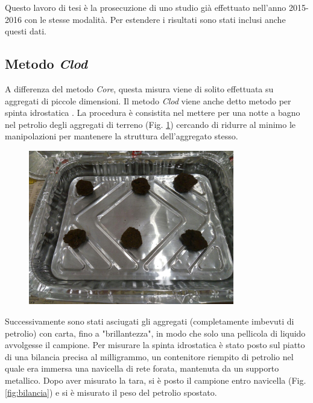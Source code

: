 \documentclass[11pt, a4paper, openright, titlepage, final, language = italian]{book}
\begin{document}
Questo lavoro di tesi \`e la prosecuzione di uno studio gi\`a
effettuato nell'anno 2015-2016 con le stesse modalit\`a. Per estendere
i risultati sono stati inclusi anche questi dati.



\subsection{Metodo \emph{Clod}}%

A differenza del metodo \emph{Core}, questa misura viene di solito
effettuata su aggregati di piccole dimensioni.  Il metodo \emph{Clod}
viene anche detto metodo per spinta idrostatica
\citep{Monnier_1973}. La procedura \`e consistita nel
mettere per una notte a bagno nel petrolio degli aggregati di
terreno (Fig. \ref{fig:petrolio}) cercando di ridurre al minimo le
manipolazioni per mantenere la struttura dell'aggregato stesso.

\begin{figure}[ht]
  \centering
  \includegraphics[width=0.8\textwidth]{../foto/petrolio.jpeg}
  \caption{\label{fig:petrolio}}
\end{figure}



Successivamente sono stati asciugati gli aggregati (completamente
imbevuti di petrolio) con carta, fino a "brillantezza", in modo che
solo una pellicola di liquido avvolgesse il campione. Per misurare la
spinta idrostatica \`e stato posto sul piatto di una bilancia precisa
al milligrammo, un contenitore riempito di petrolio nel quale era
immersa una navicella di rete forata, mantenuta da un supporto
metallico. Dopo aver misurato la tara, si \`e posto il campione entro
navicella (Fig. \ref{fig:bilancia}) e si \`e misurato il peso del
petrolio spostato.
\end{document}
